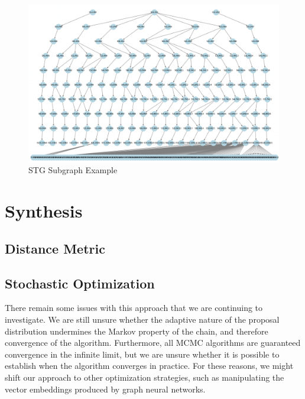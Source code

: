 \documentclass{article}
\begin{document}
\begin{figure}[h!]
  \centering
  \includegraphics[width=\linewidth]{figs/stg_full}
  \caption{STG Subgraph Example}
  \label{fig:stg_full}
\end{figure}

\section{Synthesis}\label{sec:synthesis}
\subsection{Distance Metric}\label{subsec:dist_metric}
\subsection{Stochastic Optimization}\label{subsec:stoch_opt}

There remain some issues with this approach that we are continuing to investigate.  We are still unsure whether the adaptive nature of the proposal distribution undermines the Markov property of the chain, and therefore convergence of the algorithm. Furthermore, all MCMC algorithms are guaranteed convergence in the infinite limit, but we are unsure whether it is possible to establish when the algorithm converges in practice. For these reasons, we might shift our approach to other optimization strategies, such as manipulating the vector embeddings produced by graph neural networks. 
 
\end{document}
